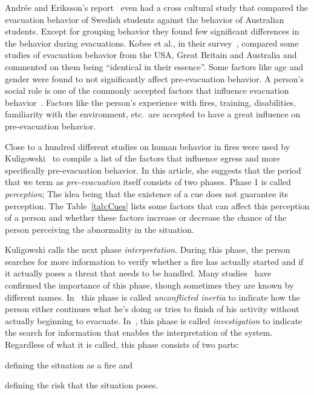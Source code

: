Andr\'{e}e and Eriksson's report~\cite{Andree:2008td} even had a cross cultural study that compared the evacuation behavior of Swedish students against the behavior of Australian students. Except for grouping behavior they found few significant differences in the behavior during evacuations. Kobes et al., in their survey~\cite{Kobes:2009jx}, compared some studies of evacuation behavior from the USA, Great Britain and Australia and commented on them being ``identical in their essence''. Some factors like age and gender were found to not significantly affect pre-evacuation behavior. A person's social role is one of the commonly accepted factors that influence evacuation behavior~\cite{Sandberg:1997tw,Kobes:2009jx,Paulsen:1984ti}. Factors like the person's experience with fires, training, disabilities, familiarity with the environment, etc.\ are accepted to have a great influence on pre-evacuation behavior.

Close to a hundred different studies on human behavior in fires were used by Kuligowski~\cite{Kuligowski:2009un} to compile a list of the factors that influence egress and more specifically pre-evacuation behavior. In this article, she suggests that the period that we term as \emph{pre-evacuation} itself consists of two phases. Phase 1 is called \emph{perception}; The idea being that the existence of a cue does not guarantee its perception. The Table~\ref{tab:Cues} lists some factors that can affect this perception of a person and whether these factors increase or decrease the chance of the person perceiving the abnormality in the situation.

Kuligowski calls the next phase \emph{interpretation}. During this phase, the person searches for more information to verify whether a fire has actually started and if it actually poses a threat that needs to be handled. Many studies~\cite{Ozel:2001tn,Proulx:2007ul} have confirmed the importance of this phase, though sometimes they are known by different names. In~\cite{Ozel:2001tn} this phase is called \emph{unconflicted inertia} to indicate how the person either continues what he's doing or tries to finish of his activity without actually beginning to evacuate. In~\cite{Tong:1985wn}, this phase is called \emph{investigation} to indicate the search for information that enables the interpretation of the system. Regardless of what it is called, this phase consists of two parts:
\begin{inparaenum}
\item defining the situation as a fire and
\item defining the risk that the situation poses.
\end{inparaenum}


